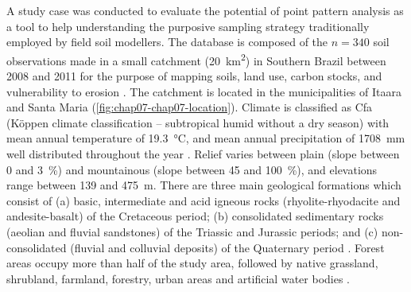 A study case was conducted to evaluate the potential of point pattern analysis as a tool to help understanding 
the purposive sampling strategy traditionally employed by field soil modellers. The database is composed of 
the $n = 340$ soil observations made in a small catchment (\SI{20}{\km\squared}) in Southern Brazil between 
\num{2008} and \num{2011} for the purpose of mapping soils, land use, carbon stocks, and vulnerability to 
erosion \cite{SamuelRosaEtAl2011a, MiguelEtAl2012, Samuel-RosaEtAl2013}. The catchment is 
located in the municipalities of Itaara and Santa Maria (\autoref{fig:chap07-chap07-location}). Climate is 
classified as Cfa (K{\"o}ppen climate classification -- subtropical humid without a dry season) with mean 
annual temperature of \SI{19.3}{\celsius}, and mean annual precipitation of \SI{1708}{\mm} well distributed 
throughout the year \cite{Maluf2000}. Relief varies between plain (slope between \num{0} and \SI{3}{\percent}) 
and mountainous (slope between \num{45} and \SI{100}{\percent}), and elevations range between \num{139} and 
\SI{475}{\m}. There are three main geological formations which consist of (a) basic, intermediate and acid 
igneous rocks (rhyolite-rhyodacite and andesite-basalt) of the Cretaceous period; (b) consolidated sedimentary 
rocks (aeolian and fluvial sandstones) of the Triassic and Jurassic periods; and (c) non-consolidated (fluvial 
and colluvial deposits) of the Quaternary period \cite{GasparettoEtAl1988, MacielFilho1990, Sartori2009}. 
Forest areas occupy more than half of the study area, followed by native grassland, shrubland, farmland, 
forestry, urban areas and artificial water bodies \cite{SamuelRosaEtAl2011a}.


